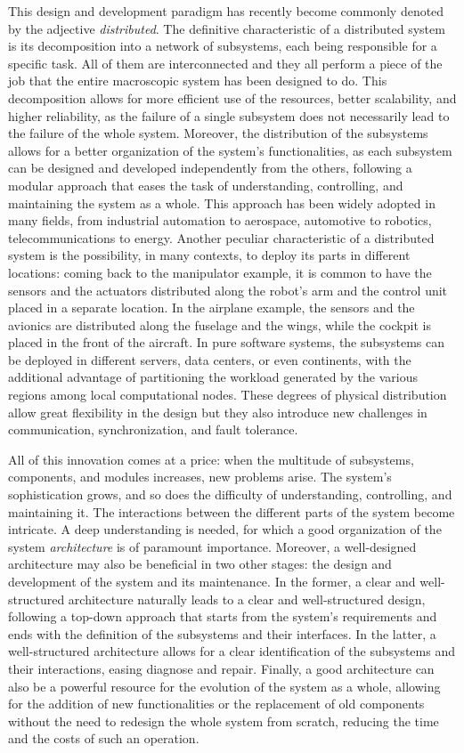 This design and development paradigm has recently become commonly denoted by the adjective \emph{distributed}. The definitive characteristic of a distributed system is its decomposition into a network of subsystems, each being responsible for a specific task. All of them are interconnected and they all perform a piece of the job that the entire macroscopic system has been designed to do. This decomposition allows for more efficient use of the resources, better scalability, and higher reliability, as the failure of a single subsystem does not necessarily lead to the failure of the whole system. Moreover, the distribution of the subsystems allows for a better organization of the system's functionalities, as each subsystem can be designed and developed independently from the others, following a modular approach that eases the task of understanding, controlling, and maintaining the system as a whole. This approach has been widely adopted in many fields, from industrial automation to aerospace, automotive to robotics, telecommunications to energy. Another peculiar characteristic of a distributed system is the possibility, in many contexts, to deploy its parts in different locations: coming back to the manipulator example, it is common to have the sensors and the actuators distributed along the robot's arm and the control unit placed in a separate location. In the airplane example, the sensors and the avionics are distributed along the fuselage and the wings, while the cockpit is placed in the front of the aircraft. In pure software systems, the subsystems can be deployed in different servers, data centers, or even continents, with the additional advantage of partitioning the workload generated by the various regions among local computational nodes. These degrees of physical distribution allow great flexibility in the design but they also introduce new challenges in communication, synchronization, and fault tolerance.

All of this innovation comes at a price: when the multitude of subsystems, components, and modules increases, new problems arise. The system's sophistication grows, and so does the difficulty of understanding, controlling, and maintaining it. The interactions between the different parts of the system become intricate. A deep understanding is needed, for which a good organization of the system \emph{architecture} is of paramount importance. Moreover, a well-designed architecture may also be beneficial in two other stages: the design and development of the system and its maintenance. In the former, a clear and well-structured architecture naturally leads to a clear and well-structured design, following a top-down approach that starts from the system's requirements and ends with the definition of the subsystems and their interfaces. In the latter, a well-structured architecture allows for a clear identification of the subsystems and their interactions, easing diagnose and repair. Finally, a good architecture can also be a powerful resource for the evolution of the system as a whole, allowing for the addition of new functionalities or the replacement of old components without the need to redesign the whole system from scratch, reducing the time and the costs of such an operation.

